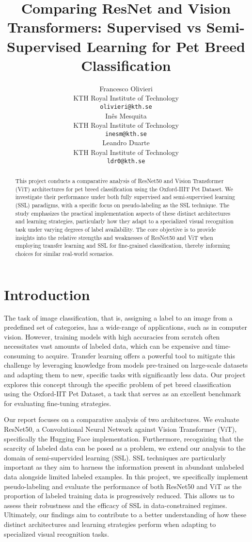\documentclass{article}
\title{Comparing ResNet and Vision Transformers: Supervised vs Semi-Supervised Learning for Pet Breed Classification}
\author{%
  Francesco Olivieri \\
  KTH Royal Institute of Technology \\
  \texttt{olivieri@kth.se} \\
  \And
  Inês Mesquita \\
  KTH Royal Institute of Technology \\
  \texttt{inesm@kth.se} \\
  \And
  Leandro Duarte \\
  KTH Royal Institute of Technology \\
  \texttt{ldr0@kth.se} \\
}
\begin{document}
\maketitle

\begin{abstract}
This project conducts a comparative analysis of ResNet50 and Vision Transformer (ViT) architectures for pet breed classification using the Oxford-IIIT Pet Dataset. We investigate their performance under both fully supervised and semi-supervised learning (SSL) paradigms, with a specific focus on pseudo-labeling as the SSL technique. The study emphasizes the practical implementation aspects of these distinct architectures and learning strategies, particularly how they adapt to a specialized visual recognition task under varying degrees of label availability. The core objective is to provide insights into the relative strengths and weaknesses of ResNet50 and ViT when employing transfer learning and SSL for fine-grained classification, thereby informing choices for similar real-world scenarios.

\end{abstract}

\newpage
\section{Introduction}
The task of image classification, that is, assigning a label to an image from a predefined set of categories, has a wide-range of applications, such as in computer vision. However, training models with high accuracies from scratch often necessitates vast amounts of labeled data, which can be expensive and time-consuming to acquire. Transfer learning offers a powerful tool to mitigate this challenge by leveraging knowledge from models pre-trained on large-scale datasets and adapting them to new, specific tasks with significantly less data. Our project explores this concept through the specific problem of pet breed classification using the Oxford-IIT Pet Dataset, a task that serves as an excellent benchmark for evaluating fine-tuning strategies.

Our report focuses on a comparative analysis of two architectures. We evaluate ResNet50, a Convolutional Neural Network against Vision Transformer (ViT), specifically the Hugging Face implementation. Furthermore, recognizing that the scarcity of labeled data can be posed as a problem, we extend our analysis to the domain of semi-supervided learning (SSL). SSL techniques are particularly important as they aim to harness the information present in abundant unlabeled data alongside limited labeled examples. In this project, we specifically implement pseudo-labeling and evaluate the performance of both ResNet50 and ViT as the proportion of labeled training data is progressively reduced. This allows us to assess their robustness and the efficacy of SSL in data-constrained regimes. Ultimately, our findings aim to contribute to a better understanding of how these distinct architectures and learning strategies perform when adapting to specialized visual recognition tasks.
\end{document}
